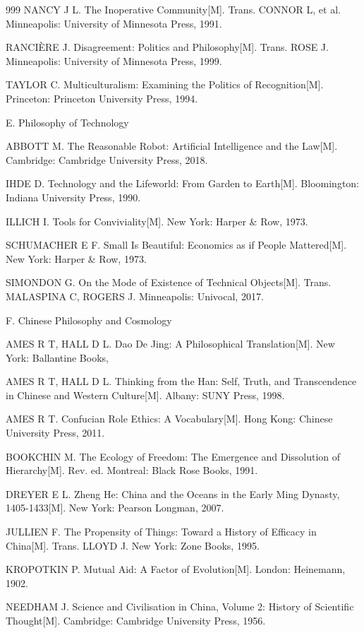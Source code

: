 \begin{thebibliography}{999}
\bibitem{} NANCY J L. The Inoperative Community[M]. Trans. CONNOR L, et al. Minneapolis: University of Minnesota Press, 1991.

\bibitem{} RANCIÈRE J. Disagreement: Politics and Philosophy[M]. Trans. ROSE J. Minneapolis: University of Minnesota Press, 1999.

\bibitem{} TAYLOR C. Multiculturalism: Examining the Politics of Recognition[M]. Princeton: Princeton University Press, 1994.

\bibitem{} E. Philosophy of Technology

\bibitem{} ABBOTT M. The Reasonable Robot: Artificial Intelligence and the Law[M]. Cambridge: Cambridge University Press, 2018.

\bibitem{} IHDE D. Technology and the Lifeworld: From Garden to Earth[M]. Bloomington: Indiana University Press, 1990.

\bibitem{} ILLICH I. Tools for Conviviality[M]. New York: Harper \& Row, 1973.

\bibitem{} SCHUMACHER E F. Small Is Beautiful: Economics as if People Mattered[M]. New York: Harper \& Row, 1973.

\bibitem{} SIMONDON G. On the Mode of Existence of Technical Objects[M]. Trans. MALASPINA C, ROGERS J. Minneapolis: Univocal, 2017.

\bibitem{} F. Chinese Philosophy and Cosmology

\bibitem{} AMES R T, HALL D L. Dao De Jing: A Philosophical Translation[M]. New York: Ballantine Books,

\bibitem{} AMES R T, HALL D L. Thinking from the Han: Self, Truth, and Transcendence in Chinese and Western Culture[M]. Albany: SUNY Press, 1998.

\bibitem{} AMES R T. Confucian Role Ethics: A Vocabulary[M]. Hong Kong: Chinese University Press, 2011.

\bibitem{} BOOKCHIN M. The Ecology of Freedom: The Emergence and Dissolution of Hierarchy[M]. Rev. ed. Montreal: Black Rose Books, 1991.

\bibitem{} DREYER E L. Zheng He: China and the Oceans in the Early Ming Dynasty, 1405-1433[M]. New York: Pearson Longman, 2007.

\bibitem{} JULLIEN F. The Propensity of Things: Toward a History of Efficacy in China[M]. Trans. LLOYD J. New York: Zone Books, 1995.

\bibitem{} KROPOTKIN P. Mutual Aid: A Factor of Evolution[M]. London: Heinemann, 1902.

\bibitem{} NEEDHAM J. Science and Civilisation in China, Volume 2: History of Scientific Thought[M]. Cambridge: Cambridge University Press, 1956.


\end{thebibliography}
